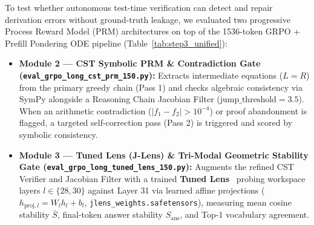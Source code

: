 \documentclass[11pt,a4paper]{article}
\begin{document}
To test whether autonomous test-time verification can detect and repair derivation errors without ground-truth leakage, we evaluated two progressive Process Reward Model (PRM) architectures on top of the 1536-token GRPO + Prefill Pondering ODE pipeline (Table~\ref{tab:step3_unified}):
\begin{itemize}
    \item \textbf{Module 2 --- CST Symbolic PRM \& Contradiction Gate (\texttt{eval\_grpo\_long\_cst\_prm\_150.py}):} Extracts intermediate equations ($L=R$) from the primary greedy chain (Pass 1) and checks algebraic consistency via SymPy alongside a Reasoning Chain Jacobian Filter ($\text{jump\_threshold}=3.5$). When an arithmetic contradiction ($|f_1 - f_2| > 10^{-4}$) or proof abandonment is flagged, a targeted self-correction pass (Pass 2) is triggered and scored by symbolic consistency.
    \item \textbf{Module 3 --- Tuned Lens (J-Lens) \& Tri-Modal Geometric Stability Gate (\texttt{eval\_grpo\_long\_tuned\_lens\_150.py}):} Augments the refined CST Verifier and Jacobian Filter with a trained \textbf{Tuned Lens}~\cite{belrose2023tunedlens} probing workspace layers $l \in \{28, 30\}$ against Layer 31 via learned affine projections ($h_{\mathrm{proj},l} = W_l h_l + b_l$, \texttt{jlens\_weights.safetensors}), measuring mean cosine stability $\bar{S}$, final-token answer stability $S_{\mathrm{ans}}$, and Top-1 vocabulary agreement.
\end{itemize}
\end{document}
